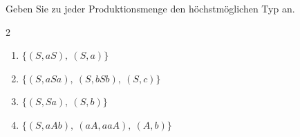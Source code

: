 Geben Sie zu jeder Produktionsmenge den höchstmöglichen Typ an.
\begin{multicols}{2}
\begin{enumerate}[label=\alph*)]
\item $\{(S, aS),\ (S, a)\}$
\item $\{(S, aSa),\ (S, bSb),\ (S, c)\}$
\item $\{(S, Sa),\ (S, b)\}$
\item $\{(S, aAb),\ (aA, aaA),\ (A, b)\}$
\end{enumerate}
\end{multicols}
